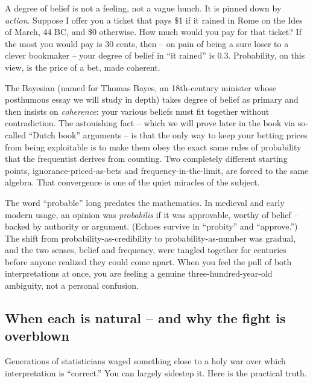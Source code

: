 \begin{intuitionbox}
A degree of belief is not a feeling, not a vague hunch. It is pinned down by
\emph{action}. Suppose I offer you a ticket that pays \$1 if it rained in Rome on
the Ides of March, 44 BC, and \$0 otherwise. How much would you pay for that
ticket? If the most you would pay is 30 cents, then -- on pain of being a sure
loser to a clever bookmaker -- your degree of belief in ``it rained'' is $0.3$.
Probability, on this view, is the price of a bet, made coherent.
\end{intuitionbox}

The Bayesian (named for Thomas Bayes, an 18th-century minister whose posthumous
essay we will study in depth) takes degree of belief as primary and then insists
on \emph{coherence}: your various beliefs must fit together without contradiction.
The astonishing fact -- which we will prove later in the book via so-called
``Dutch book'' arguments -- is that the only way to keep your betting prices from
being exploitable is to make them obey the exact same rules of probability that the
frequentist derives from counting. Two completely different starting points,
ignorance-priced-as-bets and frequency-in-the-limit, are forced to the same
algebra. That convergence is one of the quiet miracles of the subject.

\begin{historybox}
The word ``probable'' long predates the mathematics. In medieval and early modern
usage, an opinion was \emph{probabilis} if it was approvable, worthy of belief --
backed by authority or argument. (Echoes survive in ``probity'' and ``approve.'')
The shift from probability-as-credibility to probability-as-number was gradual,
and the two senses, belief and frequency, were tangled together for centuries
before anyone realized they could come apart. When you feel the pull of both
interpretations at once, you are feeling a genuine three-hundred-year-old
ambiguity, not a personal confusion.
\end{historybox}

\subsection{When each is natural -- and why the fight is overblown}
\label{ch01:which-when}

Generations of statisticians waged something close to a holy war over which
interpretation is ``correct.'' You can largely sidestep it. Here is the practical
truth.

